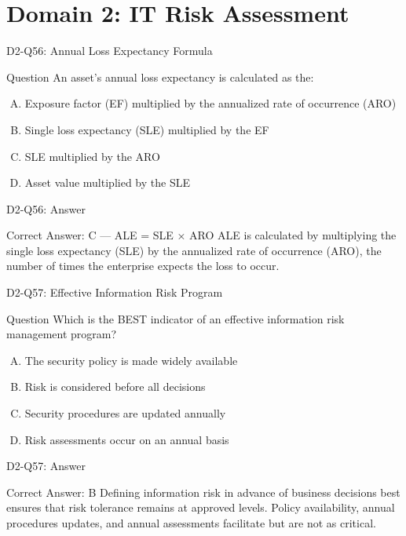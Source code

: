 \documentclass{beamer}
\begin{document}
	\section{Domain 2: IT Risk Assessment}
	
	\begin{frame}{D2-Q56: Annual Loss Expectancy Formula}
		\begin{block}{Question}
			An asset's annual loss expectancy is calculated as the:
		\end{block}
		\begin{enumerate}[(A)]
			\item Exposure factor (EF) multiplied by the annualized rate of occurrence (ARO)
			\item Single loss expectancy (SLE) multiplied by the EF
			\item SLE multiplied by the ARO
			\item Asset value multiplied by the SLE
		\end{enumerate}
	\end{frame}
	\begin{frame}{D2-Q56: Answer}
		\begin{block}{Correct Answer: C --- ALE = SLE × ARO}
			ALE is calculated by multiplying the single loss expectancy (SLE) by the annualized rate of occurrence (ARO), the number of times the enterprise expects the loss to occur.
		\end{block}
	\end{frame}
	
	\begin{frame}{D2-Q57: Effective Information Risk Program}
		\begin{block}{Question}
			Which is the BEST indicator of an effective information risk management program?
		\end{block}
		\begin{enumerate}[(A)]
			\item The security policy is made widely available
			\item Risk is considered before all decisions
			\item Security procedures are updated annually
			\item Risk assessments occur on an annual basis
		\end{enumerate}
	\end{frame}
	\begin{frame}{D2-Q57: Answer}
		\begin{block}{Correct Answer: B}
			Defining information risk in advance of business decisions best ensures that risk tolerance remains at approved levels. Policy availability, annual procedures updates, and annual assessments facilitate but are not as critical.
		\end{block}
	\end{frame}
	
\end{document}
